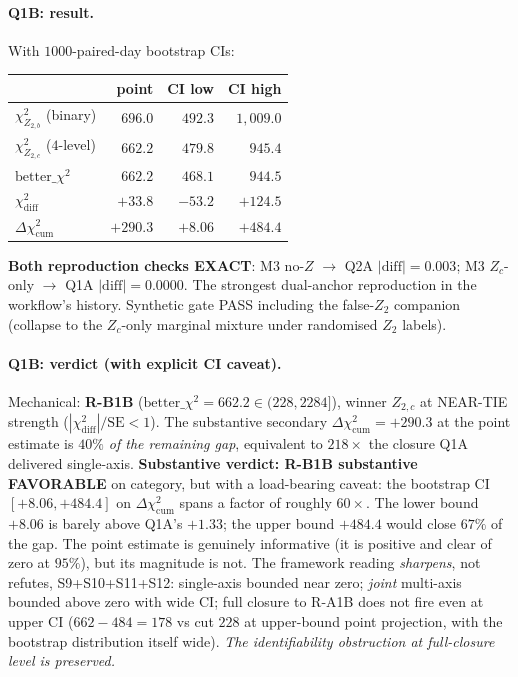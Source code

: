 \documentclass[11pt]{article}
\theoremstyle{definition}
\theoremstyle{plain}
\begin{document}
\paragraph{Q1B: result.}
With $1000$-paired-day bootstrap CIs:

\begin{center}
\begin{tabular}{lrrr}
\toprule
& point & CI low & CI high \\
\midrule
$\chi^2_{Z_{2,b}}$ (binary)         & $696.0$ & $492.3$ & $1{,}009.0$ \\
$\chi^2_{Z_{2,c}}$ ($4$-level)      & $662.2$ & $479.8$ & $945.4$ \\
$\mathrm{better}\_\chi^2$           & $662.2$ & $468.1$ & $944.5$ \\
$\chi^2_{\mathrm{diff}}$            & $+33.8$ & $-53.2$ & $+124.5$ \\
$\Delta\chi^2_{\mathrm{cum}}$       & $+290.3$ & $+8.06$ & $+484.4$ \\
\bottomrule
\end{tabular}
\end{center}

\textbf{Both reproduction checks EXACT}: M3 no-$Z$ $\to$ Q2A
$|\mathrm{diff}| = 0.003$; M3 $Z_c$-only $\to$ Q1A $|\mathrm{diff}| =
0.0000$. The strongest dual-anchor reproduction in the workflow's
history. Synthetic gate PASS including the false-$Z_2$ companion
(collapse to the $Z_c$-only marginal mixture under randomised
$Z_2$ labels).

\paragraph{Q1B: verdict (with explicit CI caveat).}
Mechanical: \textbf{R-B1B} ($\mathrm{better}\_\chi^2 = 662.2 \in
(228, 2284]$), winner $Z_{2,c}$ at NEAR-TIE strength
($|\chi^2_{\mathrm{diff}}|/\mathrm{SE} < 1$). The substantive
secondary $\Delta\chi^2_{\mathrm{cum}} = +290.3$ at the point
estimate is \emph{$40\%$ of the remaining gap}, equivalent to
$218\times$ the closure Q1A delivered single-axis. \textbf{Substantive
verdict: R-B1B substantive FAVORABLE} on category, but with a
load-bearing caveat: the bootstrap CI $[+8.06, +484.4]$ on
$\Delta\chi^2_{\mathrm{cum}}$ spans a factor of roughly $60\times$.
The lower bound $+8.06$ is barely above Q1A's $+1.33$; the upper
bound $+484.4$ would close $67\%$ of the gap. The point estimate
is genuinely informative (it is positive and clear of zero at
$95\%$), but its magnitude is not. The framework reading
\emph{sharpens}, not refutes, S9+S10+S11+S12: single-axis bounded
near zero; \emph{joint} multi-axis bounded above zero with wide CI;
full closure to R-A1B does not fire even at upper CI ($662 - 484 =
178$ vs cut $228$ at upper-bound point projection, with the bootstrap
distribution itself wide). \emph{The identifiability obstruction
at full-closure level is preserved.}
\end{document}
